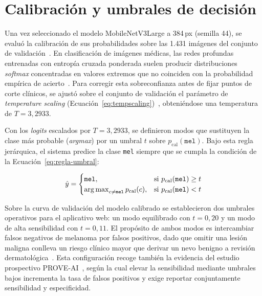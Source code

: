\section{Calibración y umbrales de decisión}

Una vez seleccionado el modelo MobileNetV3Large a 384\,px (semilla 44), se evaluó la calibración de sus probabilidades sobre las 1.431 imágenes del conjunto de validación~\cite{sambyal2023calibration,penso2024calibration}. En clasificación de imágenes médicas, las redes profundas entrenadas con entropía cruzada ponderada suelen producir distribuciones \textit{softmax} concentradas en valores extremos que no coinciden con la probabilidad empírica de acierto~\cite{guo2017calibration,sambyal2023calibration}. Para corregir esta sobreconfianza antes de fijar puntos de corte clínicos, se ajustó sobre el conjunto de validación el parámetro de \textit{temperature scaling} (Ecuación~\ref{eq:tempscaling})~\cite{guo2017calibration,penso2024calibration}, obteniéndose una temperatura de $T = 3{,}2933$.

Con los \textit{logits} escalados por $T = 3{,}2933$, se definieron modos que sustituyen la clase más probable (\textit{argmax}) por un umbral $t$ sobre $p_{\text{cal}}(\texttt{mel})$. Bajo esta regla jerárquica, el sistema predice la clase \texttt{mel} siempre que se cumpla la condición de la Ecuación~\ref{eq:regla-umbral}:

\begin{equation}
  \hat{y} =
  \begin{cases}
    \texttt{mel}, & \text{si } p_{\text{cal}}(\texttt{mel}) \ge t \\
    \argmax_{c \neq \texttt{mel}} p_{\text{cal}}(c), & \text{si } p_{\text{cal}}(\texttt{mel}) < t
  \end{cases}
  \label{eq:regla-umbral}
\end{equation}

Sobre la curva de validación del modelo calibrado se establecieron dos umbrales operativos para el aplicativo web: un modo equilibrado con $t = 0{,}20$ y un modo de alta sensibilidad con $t = 0{,}11$. El propósito de ambos modos es intercambiar falsos negativos de melanoma por falsos positivos, dado que omitir una lesión maligna conlleva un riesgo clínico mayor que derivar un nevo benigno a revisión dermatológica~\cite{barata2023reinforcement,amaral2025esmo}. Esta configuración recoge también la evidencia del estudio prospectivo PROVE-AI~\cite{marchetti2023proveai}, según la cual elevar la sensibilidad mediante umbrales bajos incrementa la tasa de falsos positivos y exige reportar conjuntamente sensibilidad y especificidad.

